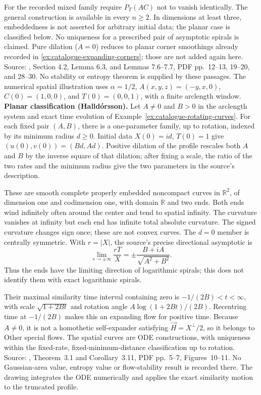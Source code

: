 \begin{example}
For the recorded mixed family require $P_T(AC)$ not to vanish identically. The general construction is available in every $n\geq2$. In dimensions at least three, embeddedness is not asserted for arbitrary initial data; the planar case is classified below. No uniqueness for a prescribed pair of asymptotic spirals is claimed. Pure dilation ($A=0$) reduces to planar corner smoothings already recorded in \ref{ex:catalogue-expanding-corners}; those are not added again here. Source: \cite{CatAAAW13}, Section 4.2, Lemma 6.3, and Lemmas 7.6--7.7, PDF pp.~12--13, 19--20, and 28--30. No stability or entropy theorem is supplied by these passages. The numerical spatial illustration uses $\alpha=1/2$, $A(x,y,z)=(-y,x,0)$, $C(0)=(1,0,0)$, and $T(0)=(0,0,1)$, with a finite arclength window.
\textbf{Planar classification (Halld\'orsson).}
Let $A\ne0$ and $B>0$ in the arclength system and exact time evolution of
Example~\ref{ex:catalogue-rotating-curves}. For each fixed pair $(A,B)$,
there is a one-parameter family, up to rotation, indexed by its minimum radius
$d\geq0$. Initial data $X(0)=id$, $T(0)=1$ give $(u(0),v(0))=(Bd,Ad)$.
Positive dilation of the profile rescales both $A$ and $B$ by the inverse
square of that dilation; after fixing a scale, the ratio of the two rates and
the minimum radius give the two parameters in the source's description.

These are smooth complete properly embedded noncompact curves in
$\mathbb R^2$, of dimension one and codimension one, with domain $\mathbb R$
and two ends. Both ends wind infinitely often around the center and tend to
spatial infinity. The curvature vanishes at infinity but each end has infinite
total absolute curvature. The signed curvature changes sign once; these are
not convex curves. The $d=0$ member is centrally symmetric. With
$r=|X|$, the source's precise directional asymptotic is
\[
 \lim_{s\to\pm\infty}\frac{rT}{X}
 =\pm\frac{B+iA}{\sqrt{A^2+B^2}}.
\]
Thus the ends have the limiting direction of logarithmic spirals; this does
not identify them with exact logarithmic spirals.

Their maximal similarity time interval containing zero is
$-1/(2B)<t<\infty$, with scale $\sqrt{1+2Bt}$ and rotation angle
$A\log(1+2Bt)/(2B)$. Recentring time at $-1/(2B)$ makes this an expanding
flow for positive time. Because $A\ne0$, it is not a homothetic self-expander
satisfying $\vec H=X^\perp/2$, so it belongs to Other special flows.
The spatial curves are ODE constructions, with uniqueness within the
fixed-rate, fixed-minimum-distance classification up to rotation.
Source: \cite{CatHalldorsson2012}, Theorem~3.1 and Corollary~3.11, PDF pp.~5--7,
Figures~10--11. No Gaussian-area value, entropy value or flow-stability result
is recorded there. The drawing integrates the ODE numerically and applies
the exact similarity motion to the truncated profile.
\end{example}

